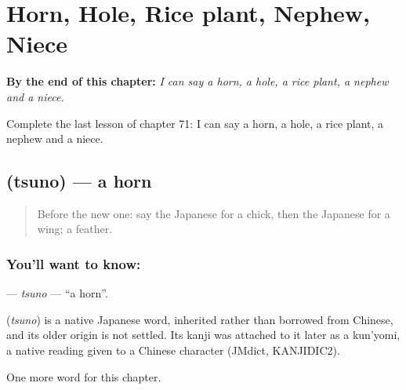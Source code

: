 
\chapter{Horn, Hole, Rice plant, Nephew, Niece}
\label{ch:ja-horn-hole-rice-plant-nephew-niece}

\begin{chapteropening}
\textbf{By the end of this chapter:} \emph{I can say a horn, a hole, a rice plant, a nephew and a niece.}

Complete the last lesson of chapter 71: I can say a horn, a hole, a rice plant, a nephew and a niece.
\end{chapteropening}

\section[\texorpdfstring{\ja{つの} (tsuno)}{つの (tsuno)}]{ (tsuno) — a horn}

\label{lesson:JA-C71-tsuno}



\begin{quote}
Before the new one: say the Japanese for a chick, then the Japanese for a wing; a feather.
\end{quote}

\subsection*{You'll want to know: }
\textbf{} — \emph{tsuno} — \textquotedblleft{}a horn\textquotedblright{}.

\begin{cousinweb}
\textbf{} (\emph{tsuno}) is a native Japanese word, inherited rather than borrowed from Chinese, and its older origin is not settled. Its kanji was attached to it later as a kun'yomi, a native reading given to a Chinese character (JMdict, KANJIDIC2).
\end{cousinweb}

\begin{grammarlens}[title={What you've built}]
One more word for this chapter.
\end{grammarlens}


